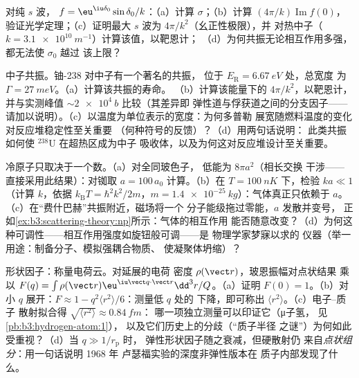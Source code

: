 \begin{exercise}[$\star\star$]\label{exo:b3:scattering-theory:9}
对纯 $s$ 波， $f = \eu^{\iu\delta_0}\sin\delta_0/
k$：（a）计算 $\sigma$；（b）计算 $(4\pi/k)\operatorname{Im}
f(0)$，验证光学定理；（c）证明最大
$s$ 波为 $4\pi/k^2$（幺正性极限），并
对热中子（$k = \qty{3.1e10}{m^{-1}}$）计算该值，以靶恩计；
（d）为何共振无论相互作用多强，都无法使 $\sigma_0$ 越过
该上限？
\end{exercise}

\begin{exercise}[$\star\star\star$]\label{exo:b3:scattering-theory:10}
中子共振。铀-238 对中子有一个著名的共振，
位于 $E_{\text{R}} = \qty{6.67}{eV}$ 处，总宽度
为 $\Gamma = \qty{27}{meV}$。（a）计算该共振的寿命。
（b）计算该能量下的 $4\pi/k^2$，以靶恩计，
并与实测峰值 $\sim\qty{2e4}{b}$ 比较（其差异即
弹性道与俘获道之间的分支因子——
请加以说明）。（c）以温度为单位表示的宽度：为何多普勒
展宽随燃料温度的变化对反应堆稳定性至关重要
（何种符号的反馈）？（d）用两句话说明：
此类共振如何使 $^{238}$U 在超热区成为中子
吸收体，以及为何这对反应堆设计至关重要。
\end{exercise}

\begin{exercise}[$\star\star\star$]\label{exo:b3:scattering-theory:11}
冷原子只取决于一个数。（a）对全同玻色子，
低能为 $8\pi a^2$（相长交换
干涉——直接采用此结果）：对铷取 $a =
100\,a_0$ 计算。（b）在 $T = \qty{100}{nK}$ 下，检验 $ka \ll 1$
（计算 $k$，依据 $k_{\text{B}}T = \hbar^2k^2/2m$，$m =
\qty{1.4e-25}{kg}$）：气体真正只依赖于 $a$。
（c）在“费什巴赫”共振附近，磁场将一个
分子能级拖过零能，$a$ 发散并变号，
正如\cref{ex:b3:scattering-theory:np}所示：气体的相互作用
能否随意改变？（d）为何这种可调性——相互作用强度如旋钮般可调——是
物理学家梦寐以求的
仪器（举一用途：制备分子、模拟强耦合物质、
使凝聚体坍缩）？
\end{exercise}

\begin{exercise}[$\star\star\star$]\label{exo:b3:scattering-theory:12}
形状因子：称量电荷云。对延展的电荷
密度 $\rho(\vect r)$，玻恩振幅对点状结果
乘以 $F(q) = \int\rho(\vect r)\eu^{\iu\vect q\cdot\vect r}
\dd^3r/Q$。（a）证明 $F(0) = 1$。（b）对小 $q$ 展开：$F
\approx 1 - q^2\langle r^2\rangle/6$：测量低 $q$ 处的
下降，即可称出 $\langle r^2\rangle$。（c）电子–质子
散射拟合得 $\sqrt{\langle r^2\rangle} \approx \qty{0.84}{fm}$：
哪一项独立测量可以印证它（μ子氢，
见\cref{pb:b3:hydrogen-atom:1}），
以及它们历史上的分歧（“质子半径
之谜”）为何如此受重视？（d）当 $q \gg 1/r_{\text{p}}$ 时，
弹性形状因子随之衰减，但硬散射仍
来自\emph{点状组分}：用一句话说明 1968 年
卢瑟福实验的深度非弹性版本在
质子内部发现了什么。
\end{exercise}

